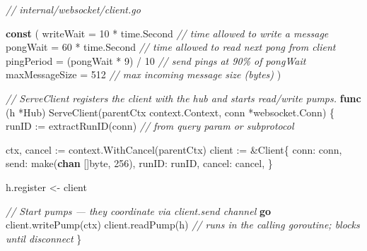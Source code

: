 \documentclass[
]{article}
\newenvironment{Shaded}{}{}
\newcommand{\BuiltInTok}[1]{\textcolor[rgb]{0.00,0.50,0.00}{#1}}
\newcommand{\CommentTok}[1]{\textcolor[rgb]{0.38,0.63,0.69}{\textit{#1}}}
\newcommand{\ControlFlowTok}[1]{\textcolor[rgb]{0.00,0.44,0.13}{\textbf{#1}}}
\newcommand{\DataTypeTok}[1]{\textcolor[rgb]{0.56,0.13,0.00}{#1}}
\newcommand{\DecValTok}[1]{\textcolor[rgb]{0.25,0.63,0.44}{#1}}
\newcommand{\KeywordTok}[1]{\textcolor[rgb]{0.00,0.44,0.13}{\textbf{#1}}}
\newcommand{\NormalTok}[1]{#1}
\newcommand{\OperatorTok}[1]{\textcolor[rgb]{0.40,0.40,0.40}{#1}}
\begin{document}
\begin{Shaded}
\begin{Highlighting}[]
\CommentTok{// internal/websocket/client.go}

\KeywordTok{const} \OperatorTok{(}
\NormalTok{    writeWait      }\OperatorTok{=} \DecValTok{10} \OperatorTok{*}\NormalTok{ time}\OperatorTok{.}\NormalTok{Second  }\CommentTok{// time allowed to write a message}
\NormalTok{    pongWait       }\OperatorTok{=} \DecValTok{60} \OperatorTok{*}\NormalTok{ time}\OperatorTok{.}\NormalTok{Second  }\CommentTok{// time allowed to read next pong from client}
\NormalTok{    pingPeriod     }\OperatorTok{=} \OperatorTok{(}\NormalTok{pongWait }\OperatorTok{*} \DecValTok{9}\OperatorTok{)} \OperatorTok{/} \DecValTok{10} \CommentTok{// send pings at 90\% of pongWait}
\NormalTok{    maxMessageSize }\OperatorTok{=} \DecValTok{512}               \CommentTok{// max incoming message size (bytes)}
\OperatorTok{)}

\CommentTok{// ServeClient registers the client with the hub and starts read/write pumps.}
\KeywordTok{func} \OperatorTok{(}\NormalTok{h }\OperatorTok{*}\NormalTok{Hub}\OperatorTok{)}\NormalTok{ ServeClient}\OperatorTok{(}\NormalTok{parentCtx context}\OperatorTok{.}\NormalTok{Context}\OperatorTok{,}\NormalTok{ conn }\OperatorTok{*}\NormalTok{websocket}\OperatorTok{.}\NormalTok{Conn}\OperatorTok{)} \OperatorTok{\{}
\NormalTok{    runID }\OperatorTok{:=}\NormalTok{ extractRunID}\OperatorTok{(}\NormalTok{conn}\OperatorTok{)} \CommentTok{// from query param or subprotocol}

\NormalTok{    ctx}\OperatorTok{,}\NormalTok{ cancel }\OperatorTok{:=}\NormalTok{ context}\OperatorTok{.}\NormalTok{WithCancel}\OperatorTok{(}\NormalTok{parentCtx}\OperatorTok{)}
\NormalTok{    client }\OperatorTok{:=} \OperatorTok{\&}\NormalTok{Client}\OperatorTok{\{}
\NormalTok{        conn}\OperatorTok{:}\NormalTok{   conn}\OperatorTok{,}
\NormalTok{        send}\OperatorTok{:}   \BuiltInTok{make}\OperatorTok{(}\KeywordTok{chan} \OperatorTok{[]}\DataTypeTok{byte}\OperatorTok{,} \DecValTok{256}\OperatorTok{),}
\NormalTok{        runID}\OperatorTok{:}\NormalTok{  runID}\OperatorTok{,}
\NormalTok{        cancel}\OperatorTok{:}\NormalTok{ cancel}\OperatorTok{,}
    \OperatorTok{\}}

\NormalTok{    h}\OperatorTok{.}\NormalTok{register }\OperatorTok{\textless{}{-}}\NormalTok{ client}

    \CommentTok{// Start pumps — they coordinate via client.send channel}
    \ControlFlowTok{go}\NormalTok{ client}\OperatorTok{.}\NormalTok{writePump}\OperatorTok{(}\NormalTok{ctx}\OperatorTok{)}
\NormalTok{    client}\OperatorTok{.}\NormalTok{readPump}\OperatorTok{(}\NormalTok{h}\OperatorTok{)} \CommentTok{// runs in the calling goroutine; blocks until disconnect}
\OperatorTok{\}}


\end{Highlighting}
\end{Shaded}
\end{document}
